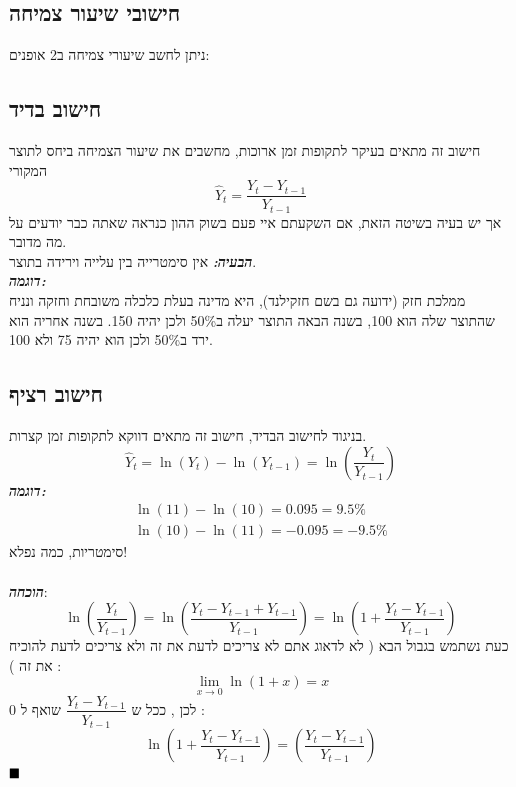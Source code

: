 \documentclass[a4paper,12pt]{article}
\renewcommand{\qed}{\hfill\blacksquare}
\begin{document}
\begin{RTL}
\begin{hebrew}
\section{חישובי שיעור צמיחה}
ניתן לחשב שיעורי צמיחה ב2 אופנים:
\subsection{חישוב בדיד}
חישוב זה מתאים בעיקר לתקופות זמן ארוכות, מחשבים את שיעור הצמיחה ביחס לתוצר המקורי
\begin{equation*}
    \hat Y_t = \frac{Y_t - Y_{t-1}}{Y_{t-1}}
\end{equation*}
אך יש בעיה בשיטה הזאת, אם השקעתם איי פעם בשוק ההון כנראה שאתה כבר יודעים על מה מדובר.
\\
\textbf{\textit{הבעיה:}} אין סימטרייה בין עלייה וירידה בתוצר. \\
\textbf{\textit{דוגמה:}} \\
ממלכת חזק (ידועה גם בשם חזקילנד), היא מדינה בעלת כלכלה משובחת וחזקה ונניח שהתוצר שלה הוא 100, בשנה הבאה התוצר יעלה ב50\% ולכן יהיה 150. בשנה אחריה הוא ירד ב50\% ולכן הוא יהיה 75 ולא 100.
\subsection{חישוב רציף}
בניגוד לחישוב הבדיד, חישוב זה מתאים דווקא לתקופות זמן קצרות.
\begin{equation*}
    \hat Y_t = \ln (Y_t) - \ln (Y_{t-1}) = \ln \left(\frac{Y_t}{Y_{t-1}}\right)
\end{equation*}
\textbf{\textit{דוגמה:}} \\
\begin{align*}
    \ln(11) - \ln(10) = 0.095 = 9.5\% \\
    \ln(10) - \ln(11) = -0.095 = -9.5\%
\end{align*}
סימטריות, כמה נפלא!\\
\\
\textbf{\textit{הוכחה}}:
\begin{equation*}
    \ln \left (\frac{Y_t}{Y_{t-1}} \right ) = 
    \ln \left (\frac{Y_t -Y_{t-1} + Y_{t-1}}{Y_{t-1}} \right ) = 
    \ln \left (1 + \frac{Y_t - Y_{t-1}}{Y_{t-1}} \right)
\end{equation*}
כעת נשתמש בגבול הבא ( לא לדאוג אתם לא צריכים לדעת את זה ולא צריכים לדעת להוכיח את זה ) :
\begin{equation*}
    \lim_{x \to 0} \ln (1+x) = x
\end{equation*}
לכן , ככל ש $ \dfrac{Y_t - Y_{t-1}}{Y_{t-1}}$ שואף ל 0 :
$$\ln \left (1 + \dfrac{Y_t - Y_{t-1}}{Y_{t-1}} \right) = \left (\dfrac{Y_t - Y_{t-1}}{Y_{t-1}} \right)$$
$\qed$
\newpage


\end{hebrew}
\end{RTL}
\end{document}
